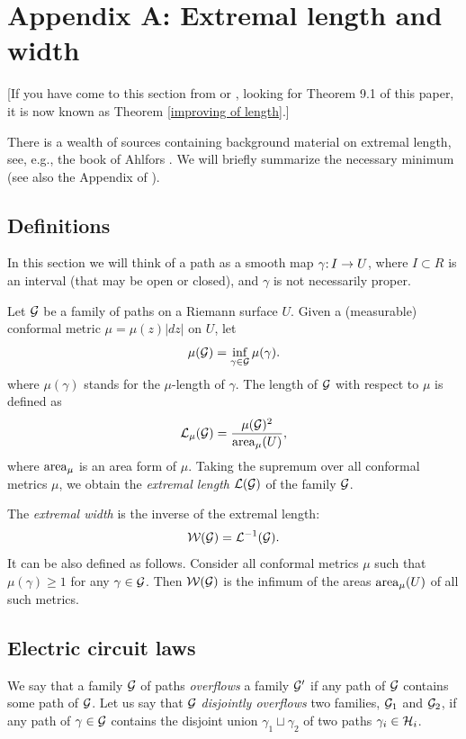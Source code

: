 
\section{Appendix A: Extremal length and width}\label{apppendix: width}
[If you have come to this section from  \cite{decorations} or \cite{molecules},
looking for Theorem 9.1 of this paper,
it is now known as Theorem \ref{improving of length}.]

There is a wealth of sources containing background material on extremal length,
see, e.g., the book of Ahlfors \cite{A}.
We will briefly summarize the necessary minimum
(see also the Appendix of \cite{covering lemma}).

\subsection{Definitions} \label{A:def}
In this section we will think of a path as a smooth map $\gamma\mathpunct: I \to U$,
where $I \subset R$ is an interval (that may be open or closed),
and $\gamma$ is not necessarily proper.

Let ${\mathcal G}$ be a family of paths on a Riemann surface $U$.
Given a (measurable) conformal metric $\mu= \mu(z) |dz|$ on $U$,
let
$$   \mu ({\mathcal G}) = \inf_{\gamma\in {\mathcal G}}  \mu (\gamma).$$
 where $\mu(\gamma) $ stands for the $\mu$-length of $\gamma$.
The length of ${\mathcal G}$  with respect to $\mu$ is defined as
$$
   {\mathcal L}_\mu ({\mathcal G}) = \frac {\mu({\mathcal G})^2 } {\operatorname{area}_\mu (U)},
$$
where $\operatorname{area}_\mu$ is an area form of $\mu$.
Taking the supremum over all conformal metrics $\mu$, we obtain the {\it extremal length}
${\mathcal L}({\mathcal G})$ of the family ${\mathcal G}$.

  The {\it extremal width} is the inverse of the extremal length:
$$
 {\mathcal W}({\mathcal G})={\mathcal L}^{-1}({\mathcal G}).
$$
It can be also defined as follows. Consider all conformal  metrics $\mu$ such that
$\mu(\gamma)\geq 1$ for any $\gamma\in {\mathcal G}$.  Then ${\mathcal W}({\mathcal G})$ is the infimum of
the areas $\operatorname{area}_\mu(U)$ of  all such metrics.


\subsection{Electric circuit laws}\label{electric}
We say that a family  ${\mathcal G}$ of paths {\it overflows} a family ${\mathcal G}'$ if
any path of ${\mathcal G}$ contains some path of ${\mathcal G}$.
Let us say that ${\mathcal G}$ {\it disjointly overflows}  two families, ${\mathcal G}_1$ and ${\mathcal G}_2$,
if any path of $\gamma\in {\mathcal G}$ contains the disjoint union $\gamma_1\sqcup \gamma_2$
of two paths $\gamma_i\in {\mathcal H}_i$.

